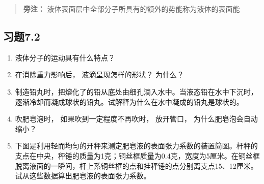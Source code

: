 \begin{quote}
\textbf{旁注：} 液体表面层中全部分子所具有的额外的势能称为液体的表面能
\end{quote}

\subsection{习题7.2}\label{ux4e60ux98987.2}

\begin{enumerate}
\def\labelenumi{\arabic{enumi}.}
\item
  液体分子的运动具有什么特点？
\item
  在消除重力影响后， 液滴呈现怎样的形状？ 为什么？
\item
  制造铅丸时，把熔化了的铅从底处由细孔滴入水中。当液态铅在水中下沉时，逐渐冷却而凝成球状的铅丸。试解释为什么在水中凝成的铅丸是球状的。
\item
  吹肥皂泡时， 如果吹到一定程度不再吹时， 放开管口，
  为什么肥皂泡会自动缩小？
\item
  下图是利用轻而均匀的开秤来测定肥皂液的表面张力系数的装置简图。杆秤的支点在中央，秤锤的质量为1克；铜丝框质量为0.4克，宽度为5厘米。在铜丝框脱离液面的一瞬间，杆上系铜丝框的点和挂秤锤的点分别离支点15、12厘米。试从这些数据算出肥皂液的表面张力系数。
\end{enumerate}


